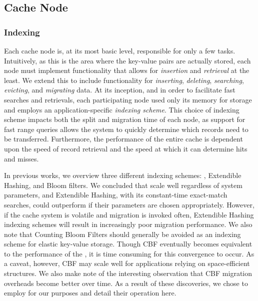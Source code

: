 
\subsection{Cache Node} %
\label{sec:Cache_Node}

\subsubsection{Indexing}
\label{sub:cache_indexing}
Each cache node is, at its most basic level, responsible for only a few tasks.
Intuitively, as this is the area where the key-value pairs are actually stored,
each node must implement functionality that allows for \emph{insertion} and
\emph{retrieval} at the least. We extend this to include functionality for
\emph{inserting}, \emph{deleting}, \emph{searching}, \emph{evicting}, and
\emph{migrating} data. At its inception, and in order to facilitate fast
searches and retrievals, each participating node used only its memory for
storage and employs an application-specific \emph{indexing scheme}. This choice
of indexing scheme impacts both the split and migration time of each node, as
support for fast range queries allows the system to quickly determine which
records need to be transferred. Furthermore, the performance of the entire
cache is dependent upon the speed of record retrieval and the speed at which it
can determine hits and misses.

In previous works\cite{chiu_ccgrid11,chiu_ijngc11}, we overview three
different indexing schemes: \bptrees, Extendible Hashing, and Bloom filters. We
concluded that \bptrees scale well regardless of system parameters, and
Extendible Hashing, with its constant-time exact-match searches, could
outperform \bptrees if their parameters are chosen appropriately. However, if
the cache system is volatile and migration is invoked often, Extendible Hashing
indexing schemes will result in increasingly poor migration performance. We
also note that Counting Bloom Filters should generally be avoided as an
indexing scheme for elastic key-value storage. Though CBF eventually becomes
equivalent to the performance of the \bptree, it is time consuming for this
convergence to occur. As a caveat, however, CBF may scale well for applications
relying on space-efficient structures. We also make note of the interesting
observation that CBF migration overheads become better over time. As a result
of these discoveries, we chose to employ \bptrees for our purposes and detail
their operation here.

